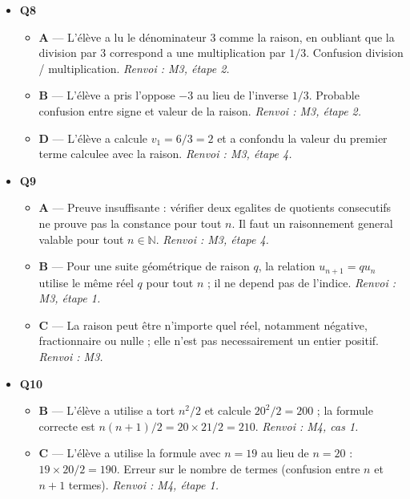 \begin{itemize}
\begin{itemize}
    \item \textbf{C} — L'élève a inverse les roles du premier terme et de la raison : il a ecrit $u_0 = 2$ et $q = 3$ au lieu de $u_0 = 3$ et $q = 2$. \emph{Renvoi : M3, étape 5.}
    \item \textbf{D} — L'élève a utilise $u_n = u_1 \times q^{n-1}$ au lieu de $u_n = u_0 \times q^n$. Decalage d'indice : confusion entre premier terme $u_0$ et premier terme $u_1$. \emph{Renvoi : M3, étape 5.}
  \end{itemize}
  \item \textbf{Q8}
  \begin{itemize}
    \item \textbf{A} — L'élève a lu le dénominateur $3$ comme la raison, en oubliant que la division par $3$ correspond a une multiplication par $1/3$. Confusion division / multiplication. \emph{Renvoi : M3, étape 2.}
    \item \textbf{B} — L'élève a pris l'oppose $-3$ au lieu de l'inverse $1/3$. Probable confusion entre signe et valeur de la raison. \emph{Renvoi : M3, étape 2.}
    \item \textbf{D} — L'élève a calcule $v_1 = 6/3 = 2$ et a confondu la valeur du premier terme calculee avec la raison. \emph{Renvoi : M3, étape 4.}
  \end{itemize}
  \item \textbf{Q9}
  \begin{itemize}
    \item \textbf{A} — Preuve insuffisante : vérifier deux egalites de quotients consecutifs ne prouve pas la constance pour tout $n$. Il faut un raisonnement general valable pour tout $n \in \mathbb{N}$. \emph{Renvoi : M3, étape 4.}
    \item \textbf{B} — Pour une suite géométrique de raison $q$, la relation $u_{n+1}=q u_n$ utilise le même réel $q$ pour tout $n$ ; il ne depend pas de l'indice. \emph{Renvoi : M3, étape 1.}
    \item \textbf{C} — La raison peut être n'importe quel réel, notamment négative, fractionnaire ou nulle ; elle n'est pas necessairement un entier positif. \emph{Renvoi : M3.}
  \end{itemize}
  \item \textbf{Q10}
  \begin{itemize}
    \item \textbf{B} — L'élève a utilise a tort $n^2/2$ et calcule $20^2/2=200$ ; la formule correcte est $n(n+1)/2=20\times21/2=210$. \emph{Renvoi : M4, cas 1.}
    \item \textbf{C} — L'élève a utilise la formule avec $n = 19$ au lieu de $n = 20$ : $19 \times 20/2 = 190$. Erreur sur le nombre de termes (confusion entre $n$ et $n+1$ termes). \emph{Renvoi : M4, étape 1.}

\end{itemize}
\end{itemize}
